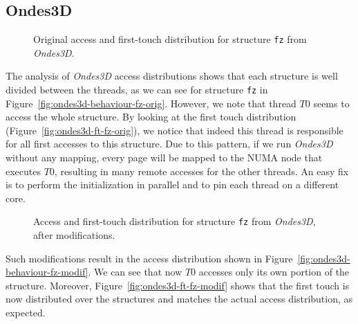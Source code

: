 \subsection{Ondes3D}
\label{sec:exp-ondes3d}

\begin{figure}[!t]
    \centering

    \caption{Original access and first-touch distribution for structure
        \texttt{fz} from \emph{Ondes3D}.}
    \label{fig:ondes3d-orig}
\end{figure}

The analysis of \emph{Ondes3D} access distributions shows that each
structure is well divided between the threads, as we can see for structure \texttt{fz} in Figure~\ref{fig:ondes3d-behaviour-fz-orig}.
However, we note that thread $T0$ seems to access the whole structure. By looking at the first touch distribution (Figure~\ref{fig:ondes3d-ft-fz-orig}), we
notice that indeed this thread is responsible for all first accesses to this structure. Due to
this pattern, if we run \emph{Ondes3D} without any mapping, every page
will be mapped to the NUMA node that executes $T0$, resulting in many remote accesses for the other threads. An easy fix is to
perform the initialization in parallel and to pin each thread on a different core.

\begin{figure}[!t]
    \centering

    \caption{Access and first-touch distribution  for structure
        \texttt{fz} from \emph{Ondes3D}, after modifications.}
    \label{fig:ondes3d-modif}
\end{figure}

Such modifications result in the access distribution shown in Figure~\ref{fig:ondes3d-behaviour-fz-modif}. We can see that now $T0$ accesses only
its own portion of the structure. Moreover, Figure~\ref{fig:ondes3d-ft-fz-modif} shows that the first touch is now distributed
over the structures and matches the actual access distribution, as expected.

